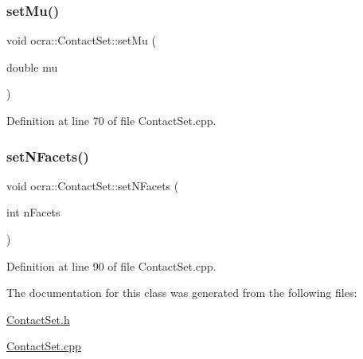 \subsubsection{\texorpdfstring{set\+Mu()}{setMu()}}
{\footnotesize\ttfamily void ocra\+::\+Contact\+Set\+::set\+Mu (\begin{DoxyParamCaption}\item[{double}]{mu }\end{DoxyParamCaption})}



Definition at line 70 of file Contact\+Set.\+cpp.

\hypertarget{classocra_1_1ContactSet_a223ef9c14b40a257d026112af1a6b279}{}\label{classocra_1_1ContactSet_a223ef9c14b40a257d026112af1a6b279} 
\subsubsection{\texorpdfstring{set\+N\+Facets()}{setNFacets()}}
{\footnotesize\ttfamily void ocra\+::\+Contact\+Set\+::set\+N\+Facets (\begin{DoxyParamCaption}\item[{int}]{n\+Facets }\end{DoxyParamCaption})}



Definition at line 90 of file Contact\+Set.\+cpp.



The documentation for this class was generated from the following files\+:\begin{DoxyCompactItemize}
\item 
\hyperlink{ContactSet_8h}{Contact\+Set.\+h}\item 
\hyperlink{ContactSet_8cpp}{Contact\+Set.\+cpp}\end{DoxyCompactItemize}
